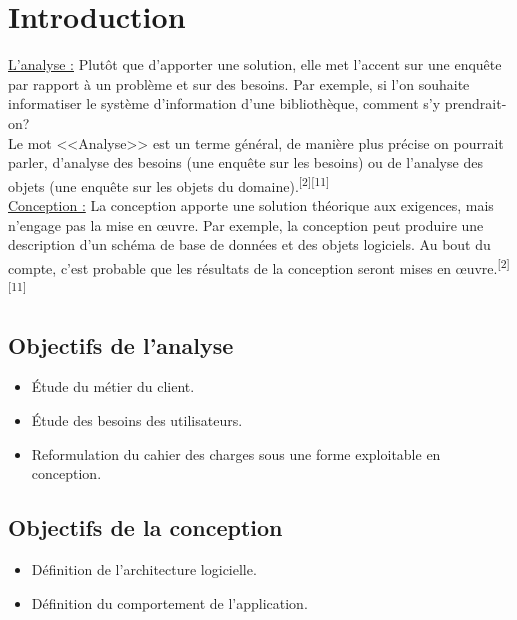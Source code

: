 \documentclass[12pt]{report}
\begin{document}
\newpage

\section{Introduction}
\vspace{0.2in}
\uline{L'analyse :} Plutôt que d’apporter une solution, elle met l’accent sur une enquête par rapport à un problème et sur des besoins. Par exemple, si l’on souhaite informatiser le système d’information d’une bibliothèque, comment s’y prendrait-on?
\\
Le mot <<Analyse>> est un terme général, de manière plus précise on pourrait parler, d’analyse des besoins (une enquête sur les besoins) ou de l’analyse des objets (une enquête sur les objets du domaine).\textsuperscript{[2][11]}
\\
\uline{Conception :} La conception apporte une solution théorique aux exigences, mais n’engage pas la mise en œuvre. Par exemple, la conception peut produire une description d’un schéma de base de données et des objets logiciels. Au bout du compte, c’est probable que les résultats de la conception seront mises en œuvre.\textsuperscript{[2][11]}

\vspace{-0.1in}

\subsection{Objectifs de l’analyse}
\begin{itemize}
    \item Étude du m\'etier du client.
    \item Étude des besoins des utilisateurs.
    \item Reformulation du cahier des charges sous une forme exploitable en conception.
\end{itemize}

\vspace{-0.15in}

\subsection{Objectifs de la conception}
\begin{itemize}
    \item D\'efinition de l’architecture logicielle.
    \item D\'efinition du comportement de l’application.
\end{itemize}
\end{document}
